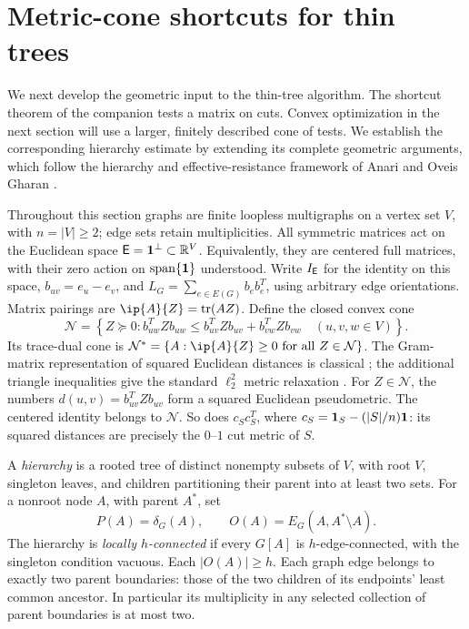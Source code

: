 \section{Metric-cone shortcuts for thin trees}\label{tg:section}

We next develop the geometric input to the thin-tree algorithm.  The
shortcut theorem of the companion \cite{ThinTreesCompanion} tests a matrix on cuts.  Convex
optimization in the next section will use a larger, finitely described
cone of tests.  We establish the corresponding hierarchy estimate by
extending its complete geometric arguments, which follow the hierarchy
and effective-resistance framework of Anari and Oveis Gharan
\cite[Sections~5--7]{AnariOveisGharan2015}.

Throughout this section graphs are finite loopless multigraphs on a
vertex set $V$, with $n=|V|\ge2$; edge sets retain multiplicities.
All symmetric matrices act on the Euclidean space
$\mathsf E=\mathbf 1^\perp\subset\mathbb R^V$.  Equivalently, they are centered full
matrices, with their zero action on $\operatorname{span}\{\mathbf 1\}$ understood.
Write $I_{\mathsf E}$ for the identity on this space,
$b_{uv}=e_u-e_v$, and $L_G=\sum_{e\in E(G)}b_eb_e^T$, using arbitrary
edge orientations.  Matrix pairings are $\ip{A}{Z}=\tr(AZ)$.
Define the closed convex cone
\begin{equation}\label{tg:test-cone}
 \mathcal N=\left\{Z\succeq0:
 b_{uw}^TZb_{uw}\le b_{uv}^TZb_{uv}+b_{vw}^TZb_{vw}
 \quad(u,v,w\in V)\right\}.
\end{equation}
Its trace-dual cone is
$\mathcal N^*=\{A:\ip{A}{Z}\ge0\text{ for all }Z\in\mathcal N\}$.
The Gram-matrix representation of squared Euclidean distances is
classical \cite{Schoenberg1935}; the additional triangle inequalities
give the standard $\ell_2^2$ metric relaxation
\cite[Section~2]{AroraRaoVazirani2009}.
For $Z\in\mathcal N$, the numbers $d(u,v)=b_{uv}^TZb_{uv}$ form
a squared Euclidean pseudometric.  The centered identity belongs to
$\mathcal N$.  So does $c_Sc_S^T$, where
$c_S=\mathbf 1_S-(|S|/n)\mathbf 1$: its squared distances are precisely the
$0$--$1$ cut metric of $S$.

A \emph{hierarchy} is a rooted tree of distinct nonempty subsets of
$V$, with root $V$, singleton leaves, and children partitioning their
parent into at least two sets.  For a nonroot node $A$, with parent
$A^*$, set
\[
 P(A)=\delta_G(A),\qquad O(A)=E_G(A,A^*\setminus A).
\]
The hierarchy is \emph{locally $h$-connected} if every $G[A]$ is
$h$-edge-connected, with the singleton condition vacuous.
Each $|O(A)|\ge h$.  Each graph edge belongs to exactly two parent
boundaries: those of the two children of its endpoints' least common
ancestor.  In particular its multiplicity in any selected collection
of parent boundaries is at most two.

